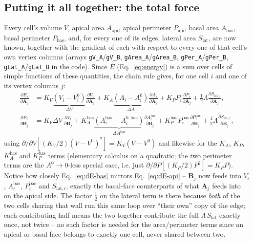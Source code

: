 \documentclass[11pt,a4paper]{report}
\newcommand{\Aarr}{\mathbf{A}}
\newcommand{\Barr}{\mathbf{B}}
\begin{document}
\subsection{Putting it all together: the total force}
\label{sec:force-assembly}
Every cell's volume $V$, apical area $A_{\mathrm{api}}$, apical
perimeter $P_{\mathrm{api}}$, basal area $A_{\mathrm{bas}}$, basal
perimeter $P_{\mathrm{bas}}$, and, for every one of its edges, lateral
area $S_{\mathrm{lat}}$, are now known, together with the gradient of
each with respect to every one of that cell's own vertex columns
(arrays \texttt{gV\_A}/\texttt{gV\_B}, \texttt{gArea\_A}/\texttt{gArea\_B},
\texttt{gPer\_A}/\texttt{gPer\_B}, \texttt{gLat\_A}/\texttt{gLat\_B} in
the code). Since $E$ (Eq.~\ref{eq:energy}) is a sum over cells of
simple functions of these quantities, the chain rule gives, for one
cell $i$ and one of its vertex columns $j$:
\begin{align}
  \frac{\partial E_i}{\partial \Aarr_j} &=
     K_V\underbrace{(V_i-V_i^0)}_{\Delta V}\frac{\partial V_i}{\partial \Aarr_j}
   + K_A\underbrace{(A_i-A_i^0)}_{\Delta A}\frac{\partial A_i}{\partial \Aarr_j}
   + K_P P_i \frac{\partial P_i}{\partial \Aarr_j}
   + \tfrac12\Lambda\frac{\partial S_{\mathrm{lat},i}}{\partial \Aarr_j}, \label{eq:dE-api}\\
  \frac{\partial E_i}{\partial \Barr_j} &=
     K_V\Delta V\,\frac{\partial V_i}{\partial \Barr_j}
   + K_A^{\mathrm{bas}}\underbrace{(A_i^{\mathrm{bas}}-A_i^{0,\mathrm{bas}})}_{\Delta A^{\mathrm{bas}}}\frac{\partial A_i^{\mathrm{bas}}}{\partial \Barr_j}
   + K_P^{\mathrm{bas}} P_i^{\mathrm{bas}} \frac{\partial P_i^{\mathrm{bas}}}{\partial \Barr_j}
   + \tfrac12\Lambda\frac{\partial S_{\mathrm{lat},i}}{\partial \Barr_j}, \label{eq:dE-bas}
\end{align}
using $\partial/\partial V[(K_V/2)(V-V^0)^2] = K_V(V-V^0)$ and
likewise for the $K_A$, $K_P$, $K_A^{\mathrm{bas}}$ and
$K_P^{\mathrm{bas}}$ terms (elementary calculus on a quadratic; the two
perimeter terms are the $A^0\to 0$-less special case, i.e. just
$\partial/\partial P[(K_P/2)P^2]=K_PP$). Notice how closely
Eq.~\ref{eq:dE-bas} mirrors Eq.~\ref{eq:dE-api} -- $\Barr_j$ now feeds
into $V_i$, $A_i^{\mathrm{bas}}$, $P_i^{\mathrm{bas}}$ and
$S_{\mathrm{lat},i}$, exactly the basal-face counterparts of what
$\Aarr_j$ feeds into on the apical side. The factor $\tfrac12$ on the
lateral term is there because \emph{both} of the two cells sharing
that wall run this same loop over ``their own'' copy of the edge; each
contributing half means the two together contribute the full
$\Lambda\,S_{\mathrm{lat}}$ exactly once, not twice -- no such factor is
needed for the area/perimeter terms since an apical or basal face
belongs to exactly one cell, never shared between two.
\end{document}
